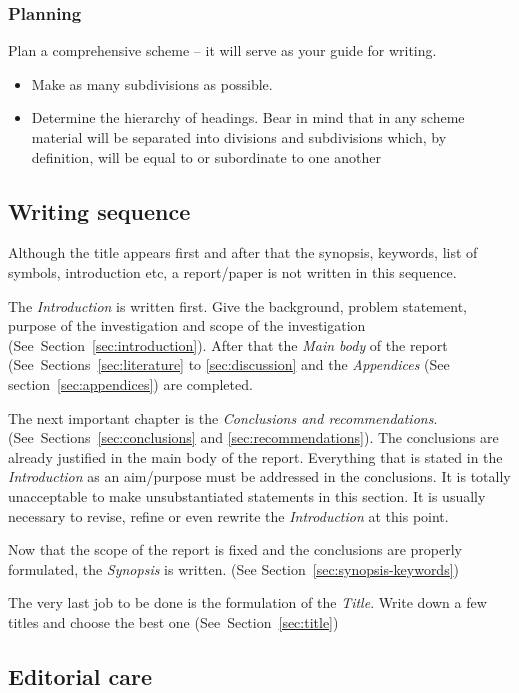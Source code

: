 \documentclass[a5paper, 10pt]{article}
\newcommand{\subsectionname}[1]{\emph{#1}}
\begin{document}
\subsubsection{Planning}
Plan a comprehensive scheme -- it will serve as your guide for writing.

\begin{itemize}
\item Make as many subdivisions as possible.
\item Determine the hierarchy of headings.  Bear in mind that in any
  scheme material will be separated into divisions and subdivisions
  which, by definition, will be equal to or subordinate to one another
\end{itemize}

\subsection{Writing sequence}
Although the title appears first and after that the synopsis,
keywords, list of symbols, introduction etc, a report/paper is not
written in this sequence.

The \subsectionname{Introduction} is written first.  Give the background,
problem statement, purpose of the investigation and scope of the
investigation (See~Section~\ref{sec:introduction}).  After that the
\subsectionname{Main body} of the report (See~Sections~\ref{sec:literature} to
\ref{sec:discussion} and the \subsectionname{Appendices} (See
section~\ref{sec:appendices}) are completed.

The next important chapter is the \subsectionname{Conclusions and
  recommendations}.  (See~Sections~\ref{sec:conclusions} and
\ref{sec:recommendations}).  The conclusions are already justified in
the main body of the report.  Everything that is stated in the
\subsectionname{Introduction} as an aim/purpose must be addressed in the
conclusions.  It is totally unacceptable to make unsubstantiated
statements in this section.  It is usually necessary to revise, refine
or even rewrite the \subsectionname{Introduction} at this point.

Now that the scope of the report is fixed and the conclusions are
properly formulated, the \subsectionname{Synopsis} is written.  (See
Section~\ref{sec:synopsis-keywords})

The very last job to be done is the formulation of
the \subsectionname{Title}.  Write down a few titles and choose the best
one (See~Section~\ref{sec:title})

\subsection{Editorial care}
\end{document}
